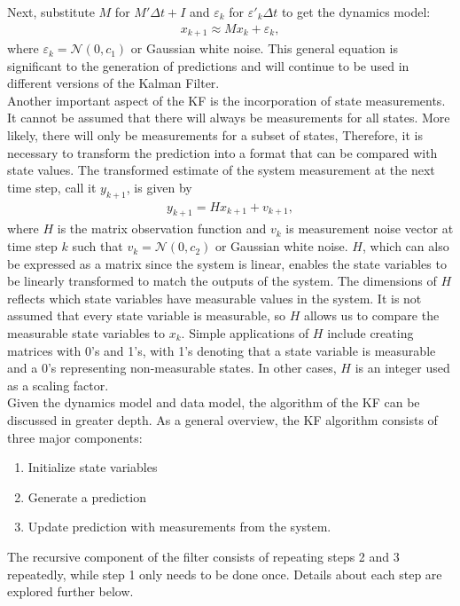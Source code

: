 \noindent Next, substitute $M$ for $M' \Delta t + I$ and $\varepsilon_k$ for  $\varepsilon '_k  \Delta t $ to get the dynamics model:
\begin{align*}
	x_{k+1} \approx M x_k + \varepsilon_k,
\end{align*}
\noindent where $\varepsilon_k = \mathcal{N}(0, c_1)$ or Gaussian white noise. This general equation is significant to the generation of predictions and will continue to be used in different versions of the Kalman Filter. \\ 

\noindent Another important aspect of the KF is the incorporation of state measurements. It cannot be assumed that there will always be measurements for all states. More likely, there will only be measurements for a subset of states, Therefore, it is necessary to transform the prediction into a format that can be compared with state values. The transformed estimate of the system measurement at the next time step, call it $y_{k+1}$, is given by 
\begin{align*}
	y_{k+1} = H x_{k+1} + v_{k+1},
\end{align*}
where $H$ is the matrix observation function and $v_k$ is measurement noise vector at time step $k$ such that $v_k = \mathcal{N}(0, c_2)$ or Gaussian white noise. $H$, which can also be expressed as a matrix since the system is linear, enables the state variables to be linearly transformed to match the outputs of the system. The dimensions of $H$ reflects which state variables have measurable values in the system. It is not assumed that every state variable is measurable, so $H$ allows us to compare the measurable state variables to $x_k$. Simple applications of $H$ include creating matrices with 0's and 1's, with 1's denoting that a state variable is measurable and a 0's representing non-measurable states. In other cases, $H$ is an integer used as a scaling factor. \\ 

\noindent Given the dynamics model and data model, the algorithm of the KF can be discussed in greater depth. As a general overview, the KF algorithm consists of three major components:
\begin{enumerate}
  \item Initialize state variables
  \item Generate a prediction
  \item Update prediction with measurements from the system.
\end{enumerate}
The recursive component of the filter consists of repeating steps 2 and 3 repeatedly, while step 1 only needs to be done once. Details about each step are explored further below. \\

